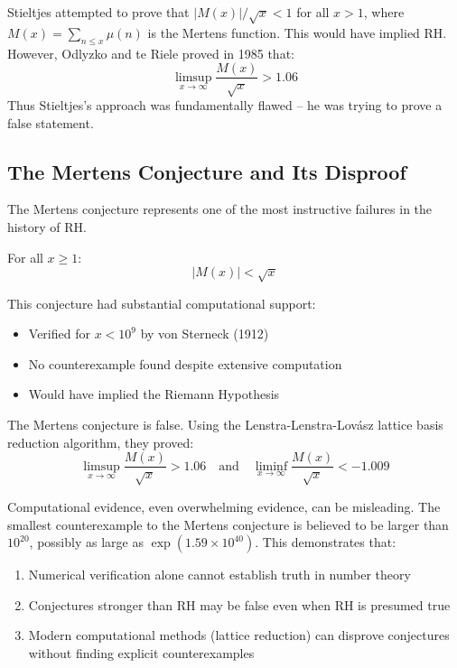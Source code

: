 \begin{lesson}
Stieltjes attempted to prove that $|M(x)|/\sqrt{x} < 1$ for all $x > 1$, where $M(x) = \sum_{n \leq x} \mu(n)$ is the Mertens function. This would have implied RH. However, Odlyzko and te Riele proved in 1985 that:
\begin{equation}
\limsup_{x \to \infty} \frac{M(x)}{\sqrt{x}} > 1.06
\end{equation}
Thus Stieltjes's approach was fundamentally flawed -- he was trying to prove a false statement.
\end{lesson}

\subsection{The Mertens Conjecture and Its Disproof}

The Mertens conjecture represents one of the most instructive failures in the history of RH.

\begin{conjecture}[Mertens, 1897]
For all $x \geq 1$:
\begin{equation}
|M(x)| < \sqrt{x}
\end{equation}
\end{conjecture}

This conjecture had substantial computational support:
\begin{itemize}
\item Verified for $x < 10^9$ by von Sterneck (1912)
\item No counterexample found despite extensive computation
\item Would have implied the Riemann Hypothesis
\end{itemize}

\begin{theorem}
The Mertens conjecture is false. Using the Lenstra-Lenstra-Lov\'asz lattice basis reduction algorithm, they proved:
\begin{equation}
\limsup_{x \to \infty} \frac{M(x)}{\sqrt{x}} > 1.06 \quad \text{and} \quad \liminf_{x \to \infty} \frac{M(x)}{\sqrt{x}} < -1.009
\end{equation}
\end{theorem}

\begin{warning}
Computational evidence, even overwhelming evidence, can be misleading. The smallest counterexample to the Mertens conjecture is believed to be larger than $10^{20}$, possibly as large as $\exp(1.59 \times 10^{40})$. This demonstrates that:
\begin{enumerate}
\item Numerical verification alone cannot establish truth in number theory
\item Conjectures stronger than RH may be false even when RH is presumed true
\item Modern computational methods (lattice reduction) can disprove conjectures without finding explicit counterexamples
\end{enumerate}
\end{warning}

